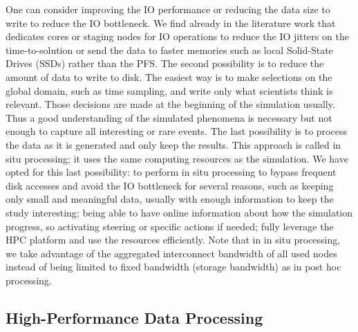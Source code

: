 One can consider improving the IO performance or reducing the data size to write to reduce the IO bottleneck. We find already in the literature work that dedicates cores or staging nodes for IO operations to reduce the IO jitters on the time-to-solution or send the data to faster memories such as local Solid-State Drives (SSDs) rather than the PFS. 
The second possibility is to reduce the amount of data to write to disk. The easiest way is to make selections on the global domain, such as time sampling, and write only what scientists think is relevant. 
Those decisions are made at the beginning of the simulation usually. Thus a good understanding of the simulated phenomena is necessary but not enough to capture all interesting or rare events. 
The last possibility is to process the data as it is generated and only keep the results. This approach is called in situ processing; it uses the same computing resources as the simulation. 
We have opted for this last possibility: to perform in situ processing to bypass frequent disk accesses and avoid the IO bottleneck for several reasons, such as keeping only small and meaningful data, usually with enough information to keep the study interesting; being able to have online information about how the simulation progress, so activating steering or specific actions if needed; fully leverage the HPC platform and use the resources efficiently.  
Note that in in situ processing, we take advantage of the aggregated interconnect bandwidth of all used nodes instead of being limited to fixed bandwidth (storage bandwidth) as in post hoc processing.

\subsection{High-Performance Data Processing}


